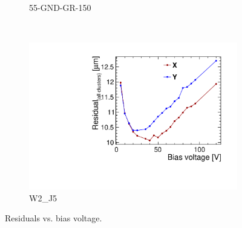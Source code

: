 \begin{figure}[htbp]
\begin{subfigure}[b]{0.33\textwidth}
    \caption{55-GND-GR-150}
  \end{subfigure}\\
  \begin{subfigure}[b]{0.33\textwidth}
    \includegraphics[width=\textwidth]{./figures/TestBeam/W2_J5_Residual_vs_bias.pdf}
    \caption{W2\_J5}
  \end{subfigure}
  \caption{Residuals vs. bias voltage.}
  \label{fig:Residuals_vs_biasVoltage}
\end{figure}

\newpage




